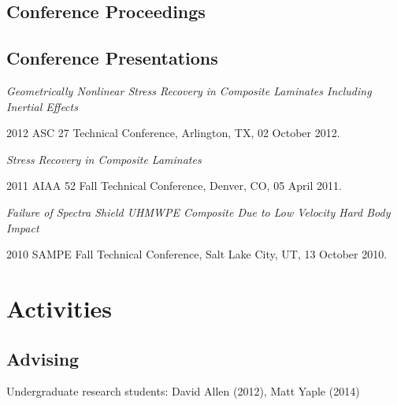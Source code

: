 \documentclass[10pt,letterpaper]{article}
\renewenvironment{itemize}{
  \begin{list}{}{
    \setlength{\leftmargin}{30pt}
    \setlength{\itemsep}{0.2em}
    \setlength{\parskip}{0pt}
    \setlength{\parsep}{0.25em}
  }
}{
  \end{list}
}
\renewcommand{\textsuperscript}[1]{%
  \raisebox{2.5pt}{\scriptsize \hspace{0.3pt}#1}%
}
\begin{document}
\begin{biblist}
\item {}
\end{biblist}

\subsection*{Conference Proceedings}
\begin{biblist}
\item {}
\item {}
\item {}
\item {}
\end{biblist}

\subsection*{Conference Presentations}
\begin{itemize}
\item \textit{Geometrically Nonlinear Stress Recovery in Composite Laminates
    Including Inertial Effects}
  \begin{itemize}
  \item 2012 ASC 27\textsuperscript{nd} Technical Conference, Arlington, TX,
    02 October 2012.
  \end{itemize}
\item \textit{Stress Recovery in Composite Laminates}
  \begin{itemize}
  \item 2011 AIAA 52\textsuperscript{nd} Fall Technical Conference,
    Denver, CO,
    05 April 2011.
  \end{itemize}
\item \textit{Failure of Spectra Shield UHMWPE Composite Due to Low Velocity
    Hard Body Impact}
  \begin{itemize}
  \item 2010 SAMPE Fall Technical Conference,
    Salt Lake City, UT,
    13 October 2010.
  \end{itemize}
\end{itemize}


\section*{Activities}
\subsection*{Advising}
\begin{itemize}
\item Undergraduate research students: David Allen (2012), Matt Yaple (2014)
\end{itemize}
\end{document}
